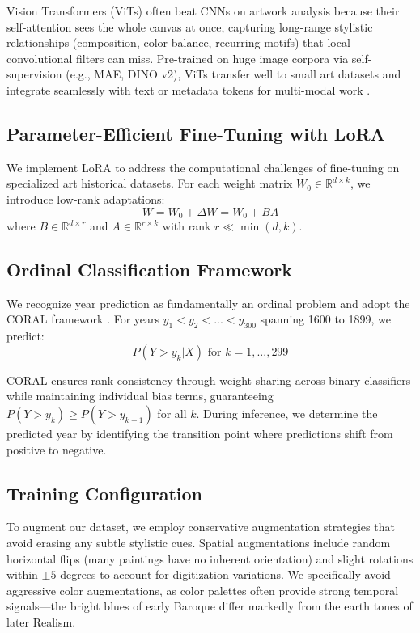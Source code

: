 \documentclass[10pt,twocolumn,letterpaper]{article}
\begin{document}
Vision Transformers (ViTs) often beat CNNs on artwork analysis because their self-attention sees the whole canvas at once, capturing long-range stylistic relationships (composition, color balance, recurring motifs) that local convolutional filters can miss. Pre-trained on huge image corpora via self-supervision (e.g., MAE, DINO v2), ViTs transfer well to small art datasets and integrate seamlessly with text or metadata tokens for multi-modal work \cite{Dosovitskiy20ViT, Oquab23}.

\subsection{Parameter-Efficient Fine-Tuning with LoRA}

We implement LoRA \cite{Hu21LoRA} to address the computational challenges of fine-tuning on specialized art historical datasets. For each weight matrix $W_0 \in \mathbb{R}^{d \times k}$, we introduce low-rank adaptations:
$$W = W_0 + \Delta W = W_0 + BA$$
where $B \in \mathbb{R}^{d \times r}$ and $A \in \mathbb{R}^{r \times k}$ with rank $r \ll \min(d, k)$.


\subsection{Ordinal Classification Framework}

We recognize year prediction as fundamentally an ordinal problem and adopt the CORAL framework \cite{Cao20Ordinal}. For years $y_1 < y_2 < ... < y_{300}$ spanning 1600 to 1899, we predict:
$$P(Y > y_k | X) \text{ for } k = 1, ..., 299$$

CORAL ensures rank consistency through weight sharing across binary classifiers while maintaining individual bias terms, guaranteeing $P(Y > y_k) \geq P(Y > y_{k+1})$ for all $k$. During inference, we determine the predicted year by identifying the transition point where predictions shift from positive to negative.

\subsection{Training Configuration}

To augment our dataset, we employ conservative augmentation strategies that avoid erasing any subtle stylistic cues. Spatial augmentations include random horizontal flips (many paintings have no inherent orientation) and slight rotations within $\pm5$ degrees to account for digitization variations. We specifically avoid aggressive color augmentations, as color palettes often provide strong temporal signals—the bright blues of early Baroque differ markedly from the earth tones of later Realism.
\end{document}
